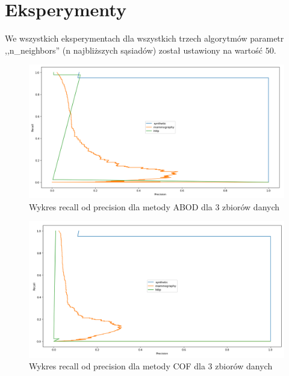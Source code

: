 \documentclass{classrep}
\begin{document}
    \section{Eksperymenty} {

        We wszystkich eksperymentach dla wszystkich trzech algorytmów
        parametr ,,n\_neighbors'' (n najbliższych sąsiadów) został
        ustawiony na wartość $50$.

        \begin{figure}[!htbp]
            \centering
            \includegraphics[width=\textwidth]{img/recall_precision_abod.png}
            \caption
            {Wykres recall od precision dla metody ABOD dla 3 zbiorów danych}
            \label{fig:abod}
        \end{figure}

        \begin{figure}[!htbp]
            \centering
            \includegraphics[width=\textwidth]{img/recall_precision_cof.png}
            \caption
            {Wykres recall od precision dla metody COF dla 3 zbiorów danych}
            \label{fig:cof}
        \end{figure}

}
\end{document}
